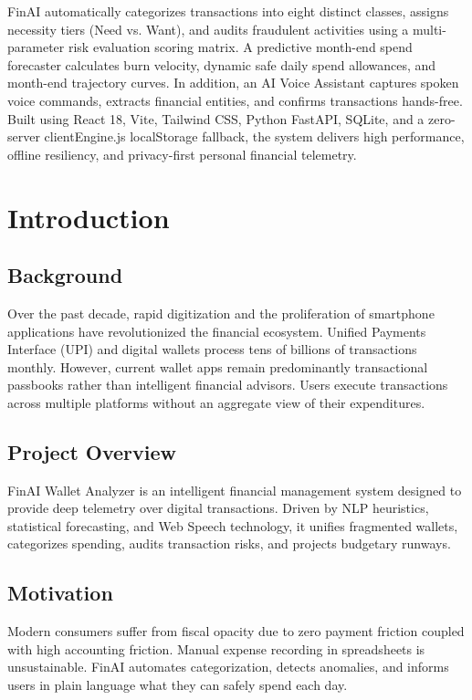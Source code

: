 \documentclass[12pt,a4paper]{report}
\begin{document}
FinAI automatically categorizes transactions into eight distinct classes, assigns necessity tiers (Need vs. Want), and audits fraudulent activities using a multi-parameter risk evaluation scoring matrix. A predictive month-end spend forecaster calculates burn velocity, dynamic safe daily spend allowances, and month-end trajectory curves. In addition, an AI Voice Assistant captures spoken voice commands, extracts financial entities, and confirms transactions hands-free. Built using React 18, Vite, Tailwind CSS, Python FastAPI, SQLite, and a zero-server clientEngine.js localStorage fallback, the system delivers high performance, offline resiliency, and privacy-first personal financial telemetry.

\newpage
\tableofcontents

\newpage
\chapter{Introduction}
\section{Background}
Over the past decade, rapid digitization and the proliferation of smartphone applications have revolutionized the financial ecosystem. Unified Payments Interface (UPI) and digital wallets process tens of billions of transactions monthly. However, current wallet apps remain predominantly transactional passbooks rather than intelligent financial advisors. Users execute transactions across multiple platforms without an aggregate view of their expenditures.

\section{Project Overview}
FinAI Wallet Analyzer is an intelligent financial management system designed to provide deep telemetry over digital transactions. Driven by NLP heuristics, statistical forecasting, and Web Speech technology, it unifies fragmented wallets, categorizes spending, audits transaction risks, and projects budgetary runways.

\section{Motivation}
Modern consumers suffer from fiscal opacity due to zero payment friction coupled with high accounting friction. Manual expense recording in spreadsheets is unsustainable. FinAI automates categorization, detects anomalies, and informs users in plain language what they can safely spend each day.
\end{document}
